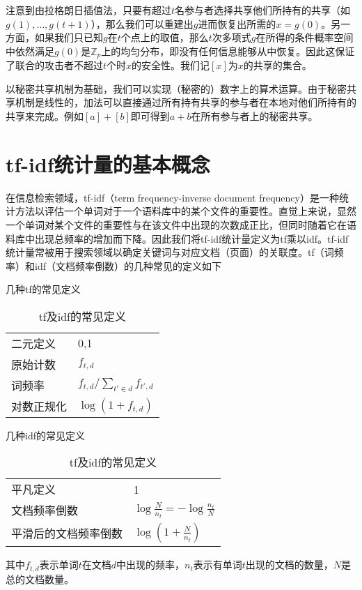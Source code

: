 注意到由拉格朗日插值法，只要有超过$t$名参与者选择共享他们所持有的共享（如$g(1),\dots,g(t+1)$），那么我们可以重建出$g$进而恢复出所需的$x=g(0)$。另一方面，如果我们只已知$g$在$t$个点上的取值，那么$t$次多项式$g$在所得的条件概率空间中依然满足$g(0)$是$\mathbb{Z}_p$上的均匀分布，即没有任何信息能够从中恢复。因此这保证了联合的攻击者不超过$t$个时$x$的安全性。我们记$[x]$为$x$的共享的集合。

以秘密共享机制为基础，我们可以实现（秘密的）数字上的算术运算。由于秘密共享机制是线性的，加法可以直接通过所有持有共享的参与者在本地对他们所持有的共享来完成。例如$[a]+[b]$即可得到$a+b$在所有参与者上的秘密共享。

\section{tf-idf统计量的基本概念}

在信息检索领域，tf-idf（term frequency-inverse document frequency）是一种统计方法以评估一个单词对于一个语料库中的某个文件的重要性。直觉上来说，显然一个单词对某个文件的重要性与在该文件中出现的次数成正比，但同时随着它在语料库中出现总频率的增加而下降。因此我们将tf-idf统计量定义为tf乘以idf。tf-idf统计量常被用于搜索领域以确定关键词与对应文档（页面）的关联度。tf（词频率）和idf（文档频率倒数）的几种常见的定义如下

\begin{table}[H]
	\centering
	\begin{subtable}{0.45\textwidth}
		\centering
		\caption{几种tf的常见定义}
		\begin{tabular}{ll}
		二元定义 & 0,1\\
		原始计数 & $f_{t,d}$\\
		词频率 & $f_{t,d}/\sum_{t'\in d}f_{t',d}$\\
		对数正规化 & $\log(1+f_{t,d})$
		\end{tabular}
	\end{subtable}
	\begin{subtable}{0.45\textwidth}
		\centering
		\caption{几种idf的常见定义}
		\begin{tabular}{ll}
		平凡定义 & 1\\
		文档频率倒数 & $\log\frac{N}{n_t}=-\log\frac{n_t}{N}$\\
		平滑后的文档频率倒数 & $\log\left(1+\frac{N}{n_t}\right)$
		\end{tabular}
	\end{subtable}
	\caption{tf及idf的常见定义}
\end{table}
其中$f_{t,d}$表示单词$t$在文档$d$中出现的频率，$n_t$表示有单词$t$出现的文档的数量，$N$是总的文档数量。

